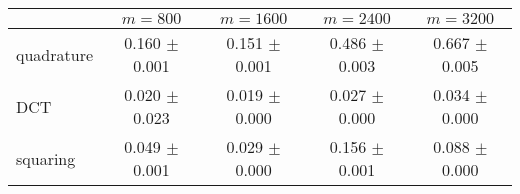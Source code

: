 \centering
\renewcommand{\arraystretch}{1.2}
\begin{tabular}{@{}lcccc@{}}
\toprule
 & $m=800$ & $m=1600$ & $m=2400$ & $m=3200$\\
\midrule
quadrature & 0.160 $\pm$ 0.001 & 0.151 $\pm$ 0.001 & 0.486 $\pm$ 0.003 & 0.667 $\pm$ 0.005 \\
DCT & 0.020 $\pm$ 0.023 & 0.019 $\pm$ 0.000 & 0.027 $\pm$ 0.000 & 0.034 $\pm$ 0.000 \\
squaring & 0.049 $\pm$ 0.001 & 0.029 $\pm$ 0.000 & 0.156 $\pm$ 0.001 & 0.088 $\pm$ 0.000 \\
\bottomrule
\end{tabular}
